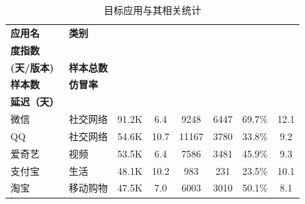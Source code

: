 \begin{ThreePartTable}
    \centering
    \renewcommand{\arraystretch}{1.05}
    \footnotesize
    \setlength{\belowcaptionskip}{-5pt}
    \vspace{1mm}
    \begin{longtable}{l l c c c c c c}
        \caption{目标应用与其相关统计}\label{table:data-statistics}                                                                                                                                      \\
        \toprule
        {\bf 应用名}                    & {\bf 类别} & \begin{tabular}[c]{@{}c@{}}{\bf 月度热} \\ {\bf 度指数} \end{tabular} & \begin{tabular}[c]{@{}c@{}}{\bf 更新频率} \\ {\bf (天/版本)} \end{tabular} & {\bf 样本总数} & \begin{tabular}[c]{@{}c@{}}{\bf 仿冒} \\ {\bf 样本数} \end{tabular} & {\bf 仿冒率} & \begin{tabular}[c]{@{}c@{}}{\bf 平均仿冒} \\ {\bf 延迟（天）} \end{tabular} \\
        \midrule
        微信                            & 社交网络   & 91.2K                      & 6.4                        & 9248           & 6447                       & 69.7\%       & 12.1                       \\
        \rowcolor{gray!15} QQ           & 社交网络   & 54.6K                      & 10.7                       & 11167          & 3780                       & 33.8\%       & 9.2                        \\
        爱奇艺                          & 视频       & 53.5K                      & 6.4                        & 7586           & 3481                       & 45.9\%       & 9.3                        \\
        \rowcolor{gray!15} 支付宝       & 生活       & 48.1K                      & 10.2                       & 983            & 231                        & 23.5\%       & 10.1                       \\
        淘宝                            & 移动购物   & 47.5K                      & 7.0                        & 6003           & 3010                       & 50.1\%       & 8.1                        \\

\end{longtable}
\end{ThreePartTable}
